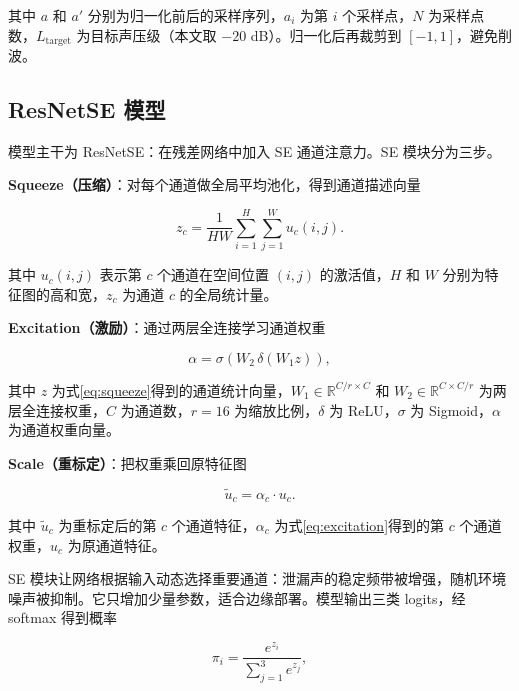 \documentclass[UTF8,11pt,a4paper,fontset=none]{ctexart}
\begin{document}
其中 \(a\) 和 \(a'\) 分别为归一化前后的采样序列，\(a_i\) 为第 \(i\) 个采样点，\(N\) 为采样点数，\(L_{\text{target}}\) 为目标声压级（本文取 \(-20\) dB）。归一化后再裁剪到 \([-1,1]\)，避免削波。

\subsection{ResNetSE 模型}

模型主干为 ResNetSE：在残差网络\cite{resnet}中加入 SE 通道注意力\cite{se}。SE 模块分为三步。

\textbf{Squeeze（压缩）}：对每个通道做全局平均池化，得到通道描述向量

\begin{equation}
  z_c = \frac{1}{HW}\sum_{i=1}^{H}\sum_{j=1}^{W}u_c(i,j).
  \label{eq:squeeze}
\end{equation}

其中 \(u_c(i,j)\) 表示第 \(c\) 个通道在空间位置 \((i,j)\) 的激活值，\(H\) 和 \(W\) 分别为特征图的高和宽，\(z_c\) 为通道 \(c\) 的全局统计量。

\textbf{Excitation（激励）}：通过两层全连接学习通道权重

\begin{equation}
  \alpha = \sigma\left(W_2\,\delta\left(W_1 z\right)\right),
  \label{eq:excitation}
\end{equation}

其中 \(z\) 为式\eqref{eq:squeeze}得到的通道统计向量，\(W_1\in\mathbb{R}^{C/r\times C}\) 和 \(W_2\in\mathbb{R}^{C\times C/r}\) 为两层全连接权重，\(C\) 为通道数，\(r=16\) 为缩放比例，\(\delta\) 为 ReLU，\(\sigma\) 为 Sigmoid，\(\alpha\) 为通道权重向量。

\textbf{Scale（重标定）}：把权重乘回原特征图

\begin{equation}
  \tilde{u}_c = \alpha_c \cdot u_c.
  \label{eq:scale}
\end{equation}

其中 \(\tilde{u}_c\) 为重标定后的第 \(c\) 个通道特征，\(\alpha_c\) 为式\eqref{eq:excitation}得到的第 \(c\) 个通道权重，\(u_c\) 为原通道特征。

SE 模块让网络根据输入动态选择重要通道：泄漏声的稳定频带被增强，随机环境噪声被抑制。它只增加少量参数，适合边缘部署。模型输出三类 logits，经 softmax 得到概率

\begin{equation}
  \pi_i = \frac{e^{z_i}}{\sum_{j=1}^{3}e^{z_j}},
  \label{eq:softmax}
\end{equation}
\end{document}

